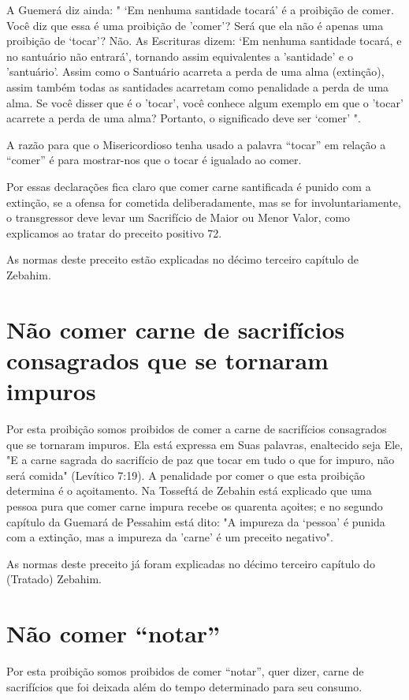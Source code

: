 A Guemerá diz ainda: " `Em nenhuma santidade tocará' é a proibi­ção de
comer. Você diz que essa é uma proibição de 'comer'? Será que ela não é
apenas uma proibição de `tocar'? Não. As Escrituras dizem: `Em nenhuma
san­tidade tocará, e no santuário não entrará', tornando assim
equivalentes a 'santi­dade' e o 'santuário'. Assim como o Santuário
acarreta a perda de uma alma (extinção), assim também todas as
santidades acarretam como penalidade a perda de uma alma. Se você disser
que é o 'tocar', você conhece algum exemplo em que o 'tocar' acarrete a
perda de uma alma? Portanto, o significado deve ser `comer' ".

A razão para que o Misericordioso tenha usado a palavra ``tocar'' em
relação a ``comer'' é para mostrar-nos que o tocar é igualado ao comer.

Por essas declarações fica claro que comer carne santificada é puni­do
com a extinção, se a ofensa for cometida deliberadamente, mas se for
invo­luntariamente, o transgressor deve levar um Sacrifício de Maior ou
Menor Va­lor, como explicamos ao tratar do preceito positivo 72.

As normas deste preceito estão explicadas no décimo terceiro capí­tulo
de Zebahim.

\section{Não comer carne de sacrifícios consagrados que se tornaram impuros}

Por esta proibição somos proibidos de comer a carne de sacrifícios
consagrados que se tornaram impuros. Ela está expressa em Suas palavras,
enal­tecido seja Ele, "E a carne sagrada do sacrifício de paz que tocar
em tudo o que for impuro, não será comida" (Levítico 7:19). A penalidade
por comer o que esta proibição determina é o açoitamento. Na Tosseftá de
Zebahin está ex­plicado que uma pessoa pura que comer carne impura
recebe os quarenta açoites; 
e no segundo capítulo da Guemará de Pessahim está dito: "A impureza
da `pessoa' é punida com a extinção, mas a impureza da 'carne' é um
preceito negativo".

As normas deste preceito já foram explicadas no décimo terceiro
ca­pítulo do (Tratado) Zebahim.

\section{Não comer ``notar''}

Por esta proibição somos proibidos de comer ``notar'', quer dizer, carne
de sacrifícios que foi deixada além do tempo determinado para seu
consumo.

